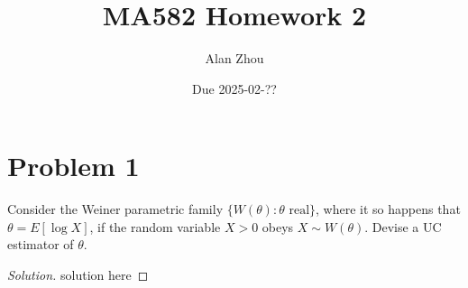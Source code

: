 \documentclass{article}
\title{MA582 Homework 2}
\author{Alan Zhou}
\date{Due 2025-02-??}
\begin{document}
\maketitle


\section{Problem 1}

Consider the Weiner parametric family $\{W(\theta):\theta\text{ real}\}$, where it so happens that $\theta = E[\log X]$, if the random variable $X > 0$ obeys $X\sim W(\theta)$. Devise a UC estimator of $\theta$.

\begin{proof}[Solution]
solution here

\end{proof}
\end{document}
